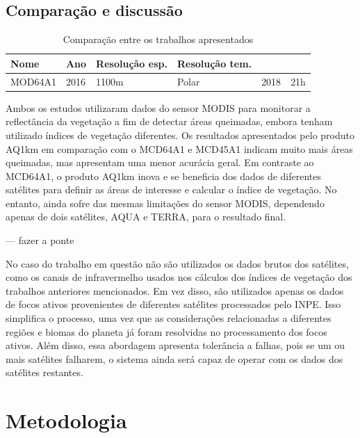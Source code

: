 \documentclass[cic,tc]{iiufrgs}
\begin{document}
\section*{Comparação e discussão}

\begin{table}[htbp]
\centering
\caption{Comparação entre os trabalhos apresentados}
\begin{tabular}{ @{}llllcl@{} }
  \toprule
  Nome    & Ano & Resolução esp. & Resolução tem. \\
  \midrule
  MOD64A1 & 2016  & 1100m       & Polar   & 2018 & 21h \\

  \bottomrule
\end{tabular}
\label{table:trabalhos_relacionados}
\end{table}


Ambos os estudos utilizaram dados do sensor MODIS para monitorar a reflectância da vegetação a fim de detectar áreas queimadas, embora tenham utilizado índices de vegetação diferentes. Os resultados apresentados pelo produto AQ1km em comparação com o MCD64A1 e MCD45A1 indicam muito mais áreas queimadas, mas apresentam uma menor acurácia geral. Em contraste ao MCD64A1, o produto AQ1km inova e se beneficia dos dados de diferentes satélites para definir as áreas de interesse e calcular o índice de vegetação. No entanto, ainda sofre das mesmas limitações do sensor MODIS, dependendo apenas de dois satélites, AQUA e TERRA, para o resultado final. \par

--- fazer a ponte

No caso do trabalho em questão não são utilizados os dados brutos dos satélites, como os canais de infravermelho usados nos cálculos dos índices de vegetação dos trabalhos anteriores mencionados. Em vez disso, são utilizados apenas os dados de focos ativos provenientes de diferentes satélites processados pelo INPE. Isso simplifica o processo, uma vez que as considerações relacionadas a diferentes regiões e biomas do planeta já foram resolvidas no processamento dos focos ativos. Além disso, essa abordagem apresenta tolerância a falhas, pois se um ou mais satélites falharem, o sistema ainda será capaz de operar com os dados dos satélites restantes. \par




\chapter{Metodologia}
\end{document}
